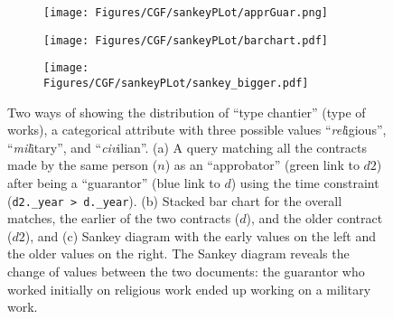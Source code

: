 


\begin{figure}
    \centering


    \begin{subfigure}[b]{0.30\linewidth}
        \texttt{[image: Figures/CGF/sankeyPLot/apprGuar.png]}
        \caption{}
    \end{subfigure}
    \begin{subfigure}[b]{0.30\linewidth}
        \texttt{[image: Figures/CGF/sankeyPLot/barchart.pdf]}
        \caption{}
    \end{subfigure}
    \begin{subfigure}[b]{0.33\linewidth}
        \texttt{[image: Figures/CGF/sankeyPLot/sankey\_bigger.pdf]}
        \caption{}
    \end{subfigure}

    \caption{Two ways of showing the distribution of ``type chantier'' (type of works), a categorical attribute with three possible values ``\textsl{rel}igious'', ``\textsl{mil}itary'', and ``\textsl{civ}ilian''.
        (a) A query matching all the contracts made by the same person ($n$) as an ``approbator'' (green link to $d2$) after being a ``guarantor'' (blue link to $d$) using the time constraint (\texttt{d2.\_year > d.\_year}). (b) Stacked bar chart for the overall matches, the earlier of the two contracts ($d$), and the older contract ($d2$), and (c) Sankey diagram with the early values on the left and the older values on the right.
        The Sankey diagram reveals the change of values between the two documents: the guarantor who worked initially on religious work ended up working on a military work.} \label{fig:sankeys}
\end{figure}

